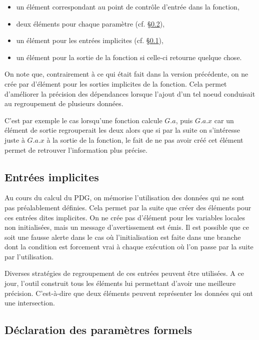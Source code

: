 \begin{itemize}
  \item un élément correspondant au point de contrôle d'entrée
dans la fonction,
\item deux éléments pour chaque paramètre (cf. \S\ref{sec-decl-param}),
\item un élément pour les entrées implicites (cf. \S\ref{sec-impl-in}),
\item un élément pour la sortie de la fonction si celle-ci retourne
  quelque chose.
\end{itemize}

On note que, contrairement à ce qui était fait dans la version précédente,
on ne crée par d'élément pour les sorties implicites de la fonction.
Cela permet d'améliorer la précision des dépendances lorsque
l'ajout d'un tel noeud conduisait au regroupement de plusieurs données.

C'est par exemple le cas lorsqu'une fonction calcule $G.a$,
puis $G.a.x$ car un élément de sortie regrouperait les deux alors que
si par la suite on s'intéresse juste à $G.a.x$ à la sortie de la fonction,
le fait de ne pas avoir créé cet élément permet de retrouver l'information plus
précise.

\subsection{Entrées implicites}\label{sec-impl-in}

Au cours du calcul du PDG, on mémorise l'utilisation des données
qui ne sont pas préalablement définies.
Cela permet par la suite que créer des éléments pour ces entrées dites
implicites. On ne crée pas d'élément pour les variables locales non
initialisées, mais un message d'avertissement est émis.
Il est possible que ce soit une fausse alerte dans le cas où l'initialisation
est faite dans une branche dont la condition est forcement vrai à chaque
exécution où l'on passe par la suite par l'utilisation.

Diverses stratégies de regroupement de ces entrées peuvent être utilisées.
A ce jour, l'outil construit tous les éléments lui permettant d'avoir une
meilleure précision. C'est-à-dire que deux éléments peuvent représenter les
données qui ont une intersection.

\subsection{Déclaration des paramètres formels}\label{sec-decl-param}

